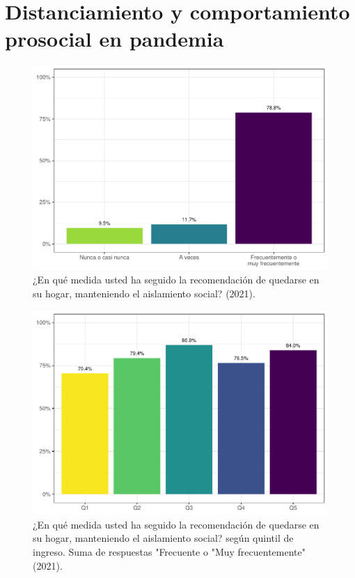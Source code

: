 \documentclass[
  12pt,
]{book}
\begin{document}
\hypertarget{distanciamiento-y-comportamiento-prosocial-en-pandemia}{%
\section{Distanciamiento y comportamiento prosocial en pandemia}\label{distanciamiento-y-comportamiento-prosocial-en-pandemia}}

\begin{figure}

{\centering \includegraphics{reporte-elsoc_files/figure-latex/dist-total-1} 

}

\caption{¿En qué medida usted ha seguido la recomendación de quedarse en su hogar, manteniendo el aislamiento social? (2021).}\label{fig:dist-total}
\end{figure}

\begin{figure}

{\centering \includegraphics{reporte-elsoc_files/figure-latex/dist-quintil-1} 

}

\caption{¿En qué medida usted ha seguido la recomendación de quedarse en su hogar, manteniendo el aislamiento social? según quintil de ingreso. Suma de respuestas "Frecuente o "Muy frecuentemente" (2021).}\label{fig:dist-quintil}
\end{figure}
\end{document}
